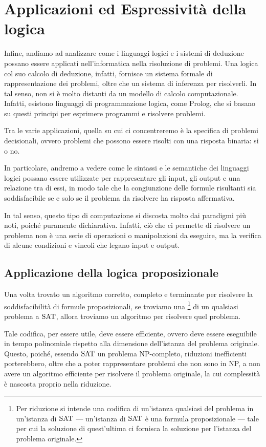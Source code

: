 \chapter{Applicazioni ed Espressività della logica}

Infine, andiamo ad analizzare come i linguaggi logici e i sistemi di deduzione possano essere applicati nell'informatica nella risoluzione di problemi. Una logica col suo calcolo di deduzione, infatti, fornisce un sistema formale di rappresentazione dei problemi, oltre che un sistema di inferenza per risolverli. 
In tal senso, non si è molto distanti da un modello di calcolo computazionale.
Infatti, esistono linguaggi di programmazione logica, come Prolog, che si basano su questi principi per esprimere programmi e risolvere problemi.

Tra le varie applicazioni, quella su cui ci concentreremo è la specifica di problemi decisionali, ovvero problemi che possono essere risolti con una risposta binaria: sì o no.

In particolare, andremo a vedere come le sintassi e le semantiche dei linguaggi logici possano essere utilizzate per rappresentare gli input, gli output e una relazione tra di essi, in modo tale che la congiunzione delle formule risultanti sia soddisfacibile se e solo se il problema da risolvere ha risposta affermativa.

In tal senso, questo tipo di computazione si discosta molto dai paradigmi più noti, poiché puramente dichiarativa. Infatti, ciò che ci permette di risolvere un problema non è una serie di operazioni o manipolazioni da eseguire, ma la verifica di alcune condizioni e vincoli che legano input e output.

\section{Applicazione della logica proposizionale}

Una volta trovato un algoritmo corretto, completo e terminante per risolvere la soddisfacibilità di formule proposizionali, se troviamo una \footnote{Per riduzione si intende una codifica di un'istanza qualsiasi del problema in un'istanza di \(\Sat\) --- un'istanza di \(\Sat\) è una formula proposizionale --- tale per cui la soluzione di quest'ultima ci fornisca la soluzione per l'istanza del problema originale.} di un qualsiasi problema a \(\Sat\), allora troviamo un algoritmo per risolvere quel problema.

Tale codifica, per essere utile, deve essere efficiente, ovvero deve essere eseguibile in tempo polinomiale rispetto alla dimensione dell'istanza del problema originale. Questo, poiché, essendo \(\Sat\) un problema NP-completo, riduzioni inefficienti porterebbero, oltre che a poter rappresentare problemi che non sono in NP, a non avere un algoritmo efficiente per risolvere il problema originale, la cui complessità è nascosta proprio nella riduzione.

